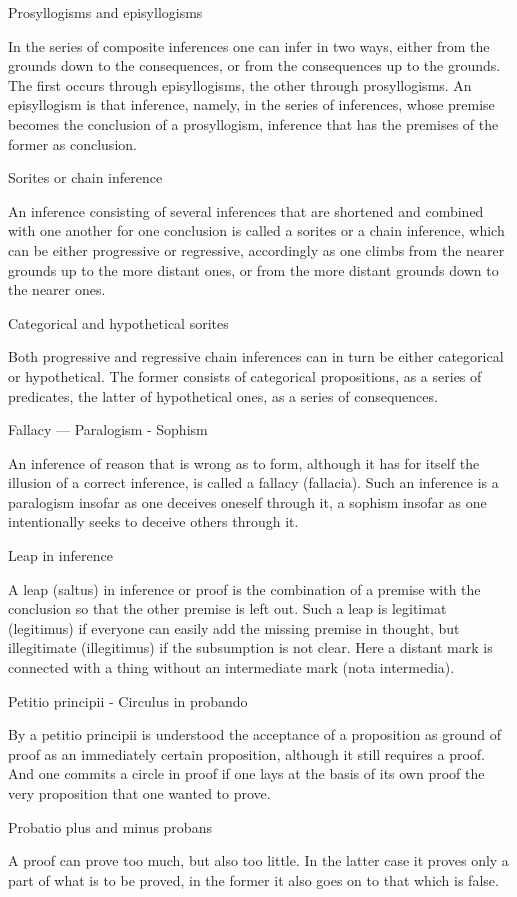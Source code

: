 Prosyllogisms and episyllogisms

In the series of composite inferences one can infer in two ways,
either from the grounds down to the consequences, or
from the consequences up to the grounds.
The first occurs through episyllogisms,
the other through prosyllogisms.
An episyllogism is that inference, namely,
in the series of inferences,
whose premise becomes the conclusion of a prosyllogism,
inference that has the premises of the former as conclusion.

Sorites or chain inference

An inference consisting of several inferences
that are shortened and combined with one another for one conclusion
is called a sorites or a chain inference,
which can be either progressive or regressive,
accordingly as one climbs from the nearer grounds
up to the more distant ones,
or from the more distant grounds
down to the nearer ones.

Categorical and hypothetical sorites

Both progressive and regressive chain inferences
can in turn be either categorical or hypothetical.
The former consists of categorical propositions,
as a series of predicates,
the latter of hypothetical ones,
as a series of consequences.

Fallacy — Paralogism - Sophism

An inference of reason that is wrong as to form,
although it has for itself the illusion of a correct inference,
is called a fallacy (fallacia).
Such an inference is a paralogism insofar as
one deceives oneself through it,
a sophism insofar as one intentionally seeks
to deceive others through it.

Leap in inference

A leap (saltus) in inference or proof is
the combination of a premise with the conclusion
so that the other premise is left out.
Such a leap is legitimat (legitimus)
if everyone can easily add the missing premise in thought,
but illegitimate (illegitimus) if the subsumption is not clear.
Here a distant mark is connected with a thing
without an intermediate mark (nota intermedia).

Petitio principii - Circulus in probando

By a petitio principii is understood
the acceptance of a proposition as ground of proof
as an immediately certain proposition,
although it still requires a proof.
And one commits a circle in proof
if one lays at the basis of its own proof
the very proposition that one wanted to prove.

Probatio plus and minus probans

A proof can prove too much, but also too little.
In the latter case it proves only a part of what is to be proved,
in the former it also goes on to that which is false.
